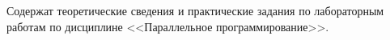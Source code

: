 
Содержат теоретические сведения и практические задания по лабораторным работам по дисциплине <<Параллельное программирование>>.


